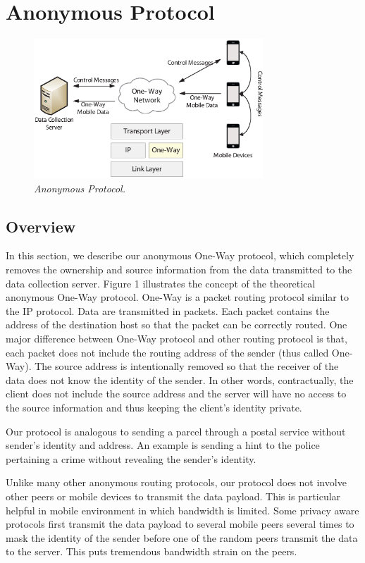 \section{Anonymous Protocol}\label{sec-protocol}

\begin{figure}[h]
\begin{center}
\includegraphics[width=3.4in]{one-way.eps}
\caption{\small \sl Anonymous Protocol.\label{fig:one-way}}
\end{center}
\end{figure}

\subsection{Overview}\label{proto-overview}
In this section, we describe our anonymous One-Way protocol, which completely
removes the ownership and
source information from the data transmitted to the data collection server.
Figure 1 illustrates the concept of the theoretical anonymous One-Way
protocol. One-Way is a packet routing protocol similar to the IP protocol.
Data are transmitted in packets. Each packet contains the address of the destination
host so that the packet can be correctly routed. One major difference between
One-Way protocol and other routing protocol is that, each packet does not
include the routing address of the sender (thus called One-Way). The source
address is intentionally removed so that the receiver of the data does not
know the identity of the sender. In other
words, contractually, the client does not include the source address and the
server will have no access to the source information and thus keeping the
client's identity private.

Our protocol is analogous to sending a parcel through a postal service without
sender's identity and address. An example is sending a hint to the police
pertaining a crime without revealing the sender's identity.

Unlike many other anonymous routing protocols, our protocol does not involve other
peers or mobile devices to transmit the data payload. This is particular helpful
in mobile environment in which bandwidth is limited. Some privacy aware protocols
first transmit the data payload to several mobile peers several times to mask
the identity of the sender before one of the random peers transmit the data to
the server. This puts tremendous bandwidth strain on the peers.

